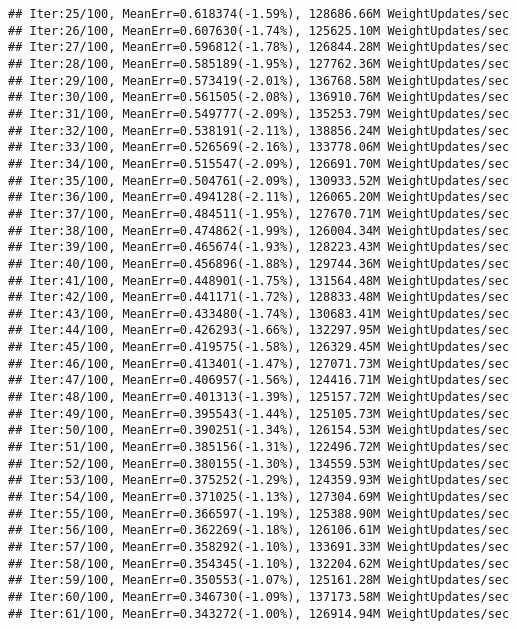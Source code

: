 \documentclass[]{book}
\theoremstyle{definition}
\theoremstyle{definition}
\theoremstyle{definition}
\theoremstyle{remark}
\begin{document}
\begin{verbatim}
## Iter:25/100, MeanErr=0.618374(-1.59%), 128686.66M WeightUpdates/sec
## Iter:26/100, MeanErr=0.607630(-1.74%), 125625.10M WeightUpdates/sec
## Iter:27/100, MeanErr=0.596812(-1.78%), 126844.28M WeightUpdates/sec
## Iter:28/100, MeanErr=0.585189(-1.95%), 127762.36M WeightUpdates/sec
## Iter:29/100, MeanErr=0.573419(-2.01%), 136768.58M WeightUpdates/sec
## Iter:30/100, MeanErr=0.561505(-2.08%), 136910.76M WeightUpdates/sec
## Iter:31/100, MeanErr=0.549777(-2.09%), 135253.79M WeightUpdates/sec
## Iter:32/100, MeanErr=0.538191(-2.11%), 138856.24M WeightUpdates/sec
## Iter:33/100, MeanErr=0.526569(-2.16%), 133778.06M WeightUpdates/sec
## Iter:34/100, MeanErr=0.515547(-2.09%), 126691.70M WeightUpdates/sec
## Iter:35/100, MeanErr=0.504761(-2.09%), 130933.52M WeightUpdates/sec
## Iter:36/100, MeanErr=0.494128(-2.11%), 126065.20M WeightUpdates/sec
## Iter:37/100, MeanErr=0.484511(-1.95%), 127670.71M WeightUpdates/sec
## Iter:38/100, MeanErr=0.474862(-1.99%), 126004.34M WeightUpdates/sec
## Iter:39/100, MeanErr=0.465674(-1.93%), 128223.43M WeightUpdates/sec
## Iter:40/100, MeanErr=0.456896(-1.88%), 129744.36M WeightUpdates/sec
## Iter:41/100, MeanErr=0.448901(-1.75%), 131564.48M WeightUpdates/sec
## Iter:42/100, MeanErr=0.441171(-1.72%), 128833.48M WeightUpdates/sec
## Iter:43/100, MeanErr=0.433480(-1.74%), 130683.41M WeightUpdates/sec
## Iter:44/100, MeanErr=0.426293(-1.66%), 132297.95M WeightUpdates/sec
## Iter:45/100, MeanErr=0.419575(-1.58%), 126329.45M WeightUpdates/sec
## Iter:46/100, MeanErr=0.413401(-1.47%), 127071.73M WeightUpdates/sec
## Iter:47/100, MeanErr=0.406957(-1.56%), 124416.71M WeightUpdates/sec
## Iter:48/100, MeanErr=0.401313(-1.39%), 125157.72M WeightUpdates/sec
## Iter:49/100, MeanErr=0.395543(-1.44%), 125105.73M WeightUpdates/sec
## Iter:50/100, MeanErr=0.390251(-1.34%), 126154.53M WeightUpdates/sec
## Iter:51/100, MeanErr=0.385156(-1.31%), 122496.72M WeightUpdates/sec
## Iter:52/100, MeanErr=0.380155(-1.30%), 134559.53M WeightUpdates/sec
## Iter:53/100, MeanErr=0.375252(-1.29%), 124359.93M WeightUpdates/sec
## Iter:54/100, MeanErr=0.371025(-1.13%), 127304.69M WeightUpdates/sec
## Iter:55/100, MeanErr=0.366597(-1.19%), 125388.90M WeightUpdates/sec
## Iter:56/100, MeanErr=0.362269(-1.18%), 126106.61M WeightUpdates/sec
## Iter:57/100, MeanErr=0.358292(-1.10%), 133691.33M WeightUpdates/sec
## Iter:58/100, MeanErr=0.354345(-1.10%), 132204.62M WeightUpdates/sec
## Iter:59/100, MeanErr=0.350553(-1.07%), 125161.28M WeightUpdates/sec
## Iter:60/100, MeanErr=0.346730(-1.09%), 137173.58M WeightUpdates/sec
## Iter:61/100, MeanErr=0.343272(-1.00%), 126914.94M WeightUpdates/sec

\end{verbatim}
\end{document}
